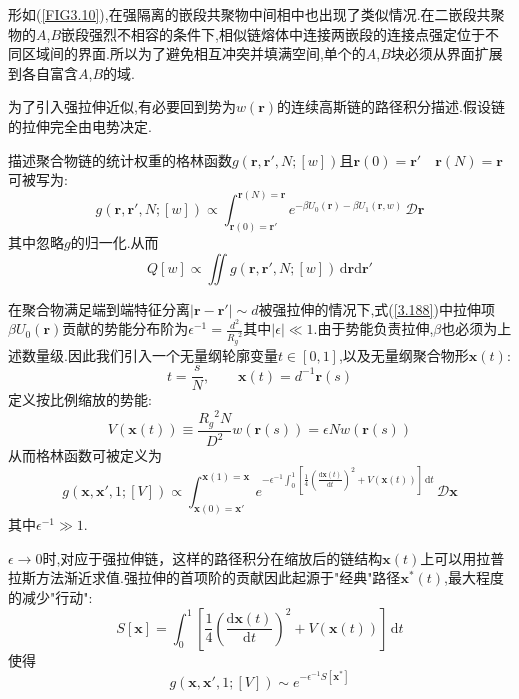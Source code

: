 形如(\ref{FIG3.10}),在强隔离的嵌段共聚物中间相中也出现了类似情况.在二嵌段共聚物的$A$,$B$嵌段强烈不相容的条件下,相似链熔体中连接两嵌段的连接点强定位于不同区域间的界面.所以为了避免相互冲突并填满空间,单个的$A$,$B$块必须从界面扩展到各自富含$A$,$B$的域.

为了引入强拉伸近似,有必要回到势为$w(\mathbf{r})$的连续高斯链的路径积分描述.假设链的拉伸完全由电势决定.

描述聚合物链的统计权重的格林函数$g(\mathbf{r},\mathbf{r}',N;[w])$且$\mathbf{r}(0) = \mathbf{r}' \quad \mathbf{r}(N) = \mathbf{r}$可被写为:
\begin{equation}
g(\mathbf{r},\mathbf{r}',N;[w]) \propto \int_{\mathbf{r}(0) = \mathbf{r}'}^{\mathbf{r}(N) = \mathbf{r}}e^{-\beta U_0(\mathbf{r})-\beta U_1(\mathbf{r},w)}\,\mathcal{D}\mathbf{r}\label{3.188}
\end{equation}
其中忽略$g$的归一化.从而
\begin{equation}
Q[w] \propto \iint g(\mathbf{r},\mathbf{r}',N;[w])\,\mathrm{d}\mathbf{r}\mathrm{d}\mathbf{r}' \label{3.189}
\end{equation}

在聚合物满足端到端特征分离$|\mathbf{r}-\mathbf{r}'| \sim d$被强拉伸的情况下,式(\ref{3.188})中拉伸项$\beta U_0(\mathbf{r})$贡献的势能分布阶为$\epsilon^{-1} = \frac{d^2}{{R_g}^2}$其中$|\epsilon| \ll 1$.由于势能负责拉伸,$\beta$也必须为上述数量级.因此我们引入一个无量纲轮廓变量$t \in [0,1]$,以及无量纲聚合物形$\mathbf{x}(t)$:
\begin{equation}
t = \frac{s}{N},\qquad \mathbf{x}(t) = d^{-1}\mathbf{r}(s)
\end{equation}
定义按比例缩放的势能:
\begin{equation}
V(\mathbf{x}(t))\equiv \frac{{R_g}^2 N}{D^2}w(\mathbf{r}(s)) = \epsilon N w(\mathbf{r}(s))
\end{equation}
从而格林函数可被定义为
\begin{equation}
g(\mathbf{x},\mathbf{x}',1;[V]) \propto \int_{\mathbf{x}(0)=\mathbf{x}'}^{\mathbf{x}(1)=\mathbf{x}}e^{-\epsilon^{-1}\int_{0}^{1}[\frac{1}{4}(\frac{\mathrm{d}\mathbf{x}(t)}{\mathrm{d}t})^2+V(\mathbf{x}(t))]\,\mathrm{d}t}\,\mathcal{D}\mathbf{x} \label{3.192}
\end{equation}
其中$\epsilon^{-1} \gg 1$.

$\epsilon \rightarrow 0$时,对应于强拉伸链，这样的路径积分在缩放后的链结构$\mathbf{x}(t)$上可以用拉普拉斯方法渐近求值.强拉伸的首项阶的贡献因此起源于"经典"路径$\mathbf{x}^*(t)$,最大程度的减少"行动":
$$
S[\mathbf{x}] = \int_{0}^{1}[\frac{1}{4}(\frac{\mathrm{d}\mathbf{x}(t)}{\mathrm{d}t})^2+V(\mathbf{x}(t))]\,\mathrm{d}t 
$$
使得
\begin{equation}
g(\mathbf{x},\mathbf{x}',1;[V]) \sim e^{-\epsilon^{-1} S[\mathbf{x}^*]} \label{3.193}
\end{equation}

